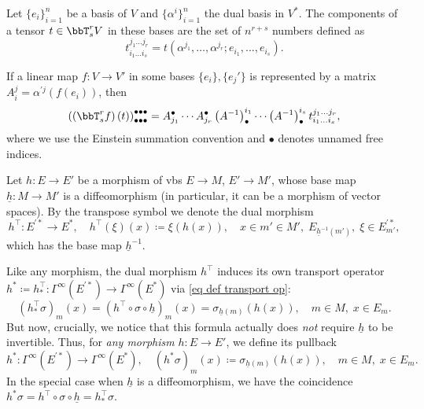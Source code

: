 \begin{defn}
    Let $\{e_i\}_{i=1}^n$ be a basis of $V$ and $\{\alpha^i\}_{i=1}^n$ the dual basis in $V^\ast$. The components of a tensor $t\in \bbT^r_s V$ in these bases are the set of $n^{r+s}$ numbers defined as
    \[
    t_{i_1\ldots i_s}^{j_1\ldots j_r}=t\left(\alpha^{j_1},\ldots,\alpha^{j_r};e_{i_1},\ldots,e_{i_s}\right).\label{eq def components}
    \]
\end{defn}

If a linear map $f:V\to V'$ in some bases $\{e_i\},\{e_j'\}$ is represented by a matrix $A_i^j=\alpha^{\prime j} (f(e_i))$, then 
\[
\left(\left(\bbT^r_s f\right)(t)\right)^{\bullet\bullet\bullet}_{\bullet\bullet\bullet}=A^\bullet_{j_1}\cdots A_{j_r}^\bullet \left(A^{-1}\right)^{i_1}_\bullet \cdots \left(A^{-1}\right)^{i_s}_\bullet t_{i_1\ldots i_s}^{j_1\ldots j_r},
\]
where we use the Einstein summation convention and $\bullet$ denotes unnamed free indices.


\begin{defn}
    Let $h:E\to E'$ be a morphism of \glspl{vb} $E\to M$, $E'\to M'$, whose base map $\underline{h}:M\to M'$ is a diffeomorphism (in particular, it can be a morphism of vector spaces). By the transpose symbol we denote the dual morphism 
    \[h^\top:E^{\prime\ast}\to E^\ast,\quad h^\top(\xi)(x)\coloneqq \xi(h(x)),\quad x\in m'\in M',\; E_{\underline{h}^{-1}(m')},\; \xi\in E^{\prime\ast}_{m'},\]
    which has the base map $\underline{h}^{-1}$.
\end{defn}

\begin{defn}\label{def pullback morphism}
    Like any morphism, the dual morphism $h^\top$ induces its own transport operator $h^\ast\coloneqq h^\top_\ast:\Gamma^\infty(E^{\prime\ast})\to \Gamma^\infty(E^\ast)$ via \eqref{eq def transport op}:
    \[\left(h^\top_\ast \sigma\right)_m(x)=(h^\top\circ \sigma\circ \underline{h})_m(x)=\sigma_{\underline{h}(m)}(h(x)),\quad m\in M,\; x\in E_m.\]
    But now, crucially, we notice that this formula actually does \emph{not} require $\underline{h}$ to be invertible. Thus, for \emph{any morphism} $h:E\to E'$, we define its pullback
    \[h^\ast:\Gamma^\infty(E^{\prime\ast})\to \Gamma^\infty(E^\ast),\quad \left(h^\ast \sigma\right)_m(x)\coloneqq \sigma_{\underline{h}(m)}(h(x)),\quad m\in M,\; x\in E_m.\]
    In the special case when $\underline h$ is a diffeomorphism, we have the coincidence $h^\ast\sigma=h^\top\circ \sigma\circ\underline h=h_\ast^\top\sigma$.
\end{defn}

